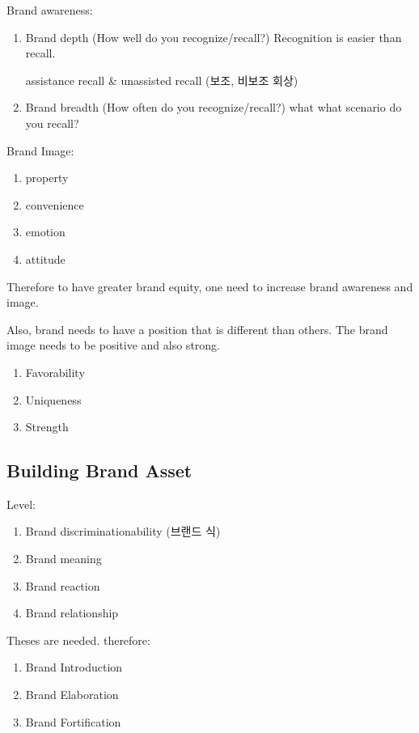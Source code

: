 \documentclass[12pt]{article}
\begin{document}
Brand awareness:
\begin{enumerate}
	\item Brand depth (How well do you recognize/recall?)
	Recognition is easier than recall.

	assistance recall & unassisted recall (보조, 비보조 회상)

	\item Brand breadth (How often do you recognize/recall?)
	what
	what scenario do you recall?

\end{enumerate}

Brand Image:

\begin{enumerate}
	\item property
	\item convenience
	\item emotion
	\item attitude
\end{enumerate}

Therefore to have greater brand equity, one need to increase brand awareness and image.

Also, brand needs to have a position that is different than others. The brand image needs to be positive and also strong.

\begin{enumerate}
	\item Favorability
	\item Uniqueness
	\item Strength
\end{enumerate}

\subsection{Building Brand Asset}

Level:

\begin{enumerate}
	\item Brand discriminationability (브랜드 식)
	\item Brand meaning
	\item Brand reaction
	\item Brand relationship
\end{enumerate}

Theses are needed. therefore:
\begin{enumerate}
	\item Brand Introduction
	\item Brand Elaboration
	\item Brand Fortification
\end{enumerate}
\end{document}
